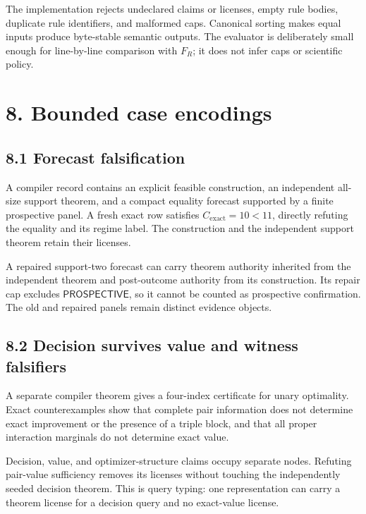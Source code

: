 \documentclass[
  11pt,
]{article}
\begin{document}
The implementation rejects undeclared claims or licenses, empty rule
bodies, duplicate rule identifiers, and malformed caps. Canonical
sorting makes equal inputs produce byte-stable semantic outputs. The
evaluator is deliberately small enough for line-by-line comparison with
\(F_R\); it does not infer caps or scientific policy.

\hypertarget{bounded-case-encodings}{%
\section{8. Bounded case encodings}\label{bounded-case-encodings}}

\hypertarget{forecast-falsification}{%
\subsection{8.1 Forecast falsification}\label{forecast-falsification}}

A compiler record contains an explicit feasible construction, an
independent all-size support theorem, and a compact equality forecast
supported by a finite prospective panel. A fresh exact row satisfies
\(C_{\mathrm{exact}}=10<11\), directly refuting the equality and its
regime label. The construction and the independent support theorem
retain their licenses.

A repaired support-two forecast can carry theorem authority inherited
from the independent theorem and post-outcome authority from its
construction. Its repair cap excludes \(\textsf{PROSPECTIVE}\), so it
cannot be counted as prospective confirmation. The old and repaired
panels remain distinct evidence objects.

\hypertarget{decision-survives-value-and-witness-falsifiers}{%
\subsection{8.2 Decision survives value and witness
falsifiers}\label{decision-survives-value-and-witness-falsifiers}}

A separate compiler theorem gives a four-index certificate for unary
optimality. Exact counterexamples show that complete pair information
does not determine exact improvement or the presence of a triple block,
and that all proper interaction marginals do not determine exact value.

Decision, value, and optimizer-structure claims occupy separate nodes.
Refuting pair-value sufficiency removes its licenses without touching
the independently seeded decision theorem. This is query typing: one
representation can carry a theorem license for a decision query and no
exact-value license.
\end{document}
